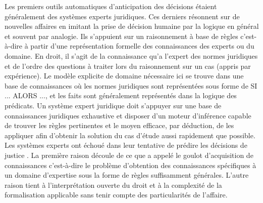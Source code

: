 Les premiers outils automatiques d'anticipation des décisions étaient généralement des systèmes experts juridiques. Ces derniers résonnent  sur de nouvelles affaires en imitant la prise de décision humaine par la logique en général et souvent par analogie. Ils s'appuient sur un raisonnement à base de règles c'est-à-dire à partir d'une représentation formelle des connaissances des experts ou du domaine. En droit, il s'agit de la connaissance qu'a l'expert des normes juridiques et de l'ordre des questions à traiter lors du raisonnement sur un cas (appris par expérience). Le modèle explicite de domaine nécessaire ici se trouve dans une base de connaissances où les normes juridiques sont représentées sous forme de \og SI ... ALORS ...\fg{}, et les faits sont généralement représentés dans la logique des prédicats. Un système expert juridique doit s’appuyer sur une base de connaissances juridiques exhaustive et disposer d’un moteur d’inférence capable de trouver les règles pertinentes et le moyen efficace, par déduction, de les appliquer afin d’obtenir la solution du cas d'étude aussi rapidement que possible. Les systèmes experts ont échoué dans leur tentative de prédire les décisions de justice \citep{leith2010risefall}. La première raison découle de ce que \citet{Berka2011rbr-cbr} a appelé le \og goulot d'acquisition de connaissances \fg{} c'est-à-dire le problème d'obtention des connaissances spécifiques à un domaine d’expertise sous la forme de règles suffisamment générales. L'autre raison tient à l'interprétation ouverte du droit et à la complexité de la formalisation applicable sans tenir compte des particularités de l'affaire.

